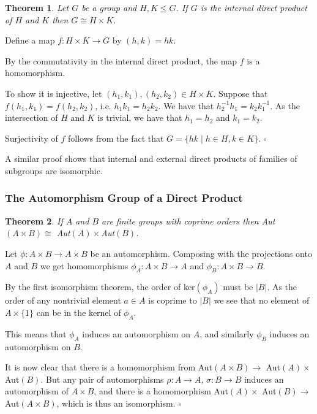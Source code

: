 \documentclass[10pt]{article}
\newtheorem{theorem}{Theorem}[section]
\newenvironment{proof}[1][Proof]{\begin{trivlist}
\item[\hskip \labelsep {\itshape #1}]}{\end{trivlist}}
\begin{document}
\begin{theorem}
Let $G$ be a group and $H, K \leq G$. If $G$ is the internal direct product of $H$ and $K$ then $G \cong H\times K$.
\end{theorem}

\begin{proof}
Define a map $f : H\times K \to G$ by $(h, k) = hk$.

By the commutativity in the internal direct product, the map $f$ is a homomorphism.

To show it is injective, let $(h_1, k_1), (h_2, k_2) \in H\times K$. Suppose that $f(h_1, k_1) = f(h_2, k_2)$, i.e. $h_1k_1 = h_2k_2$. We have that $h_2^{-1}h_1 = k_2k_1^{-1}$. As the intersection of $H$ and $K$ is trivial, we have that $h_1 = h_2$ and $k_1 = k_2$.

Surjectivity of $f$ follows from the fact that $G = \{hk \;|\; h \in H, k \in K\}$. $\square$
\end{proof}

A similar proof shows that internal and external direct products of families of subgroups are isomorphic.

\subsubsection{The Automorphism Group of a Direct Product}

\begin{theorem}
If $A$ and $B$ are finite groups with coprime orders then Aut$(A\times B) \cong$ Aut$(A)\times$Aut$(B)$.
\end{theorem}

\begin{proof}
Let $\phi : A\times B \to A\times B$ be an automorphism. Composing with the projections onto $A$ and $B$ we get homomorphisms $\phi_A : A\times B \to A$ and $\phi_B : A\times B \to B$.

By the first isomorphism theorem, the order of ker$(\phi_A)$ must be $|B|$. As the order of any nontrivial element $a \in A$ is coprime to $|B|$ we see that no element of $A\times \{1\}$ can be in the kernel of $\phi_A$.

This means that $\phi_A$ induces an automorphism on $A$, and similarly $\phi_B$ induces an automorphism on $B$.

It is now clear that there is a homomorphism from Aut$(A\times B) \to$ Aut$(A)\times$ Aut$(B)$. But any pair of automorphisms $\rho : A \to A$, $\sigma : B \to B$ induces an automorphism of $A\times B$, and there is a homomorphism Aut$(A)\times$ Aut$(B) \to$ Aut$(A\times B)$, which is thus an isomorphism. $\square$
\end{proof}
\end{document}
